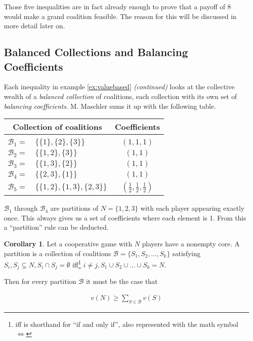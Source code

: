 \documentclass[10pt,a4paper,titlepage]{article}
\theoremstyle{plain}
\theoremstyle{definition}
\newtheorem{corollary}[thm]{Corollary}
\begin{document}
Those five inequalities are in fact already enough to prove that a payoff of 8 would make a grand coalition feasible. The reason for this will be discussed in more detail later on.




\subsection{Balanced Collections and Balancing Coefficients}
Each inequality in example \ref{ex:valuebased} \textit{(continued)} looks at the collective wealth of a \textit{balanced collection} of coalitions, each collection with its own set of \textit{balancing coefficients}. M. Maschler\cite{maschler} sums it up with the following table.\vspace{8pt}

\begin{tabular}{ | r l | c | }
    \multicolumn{2}{c}{Collection of coalitions} & \multicolumn{1}{c}{Coefficients}\\[2pt]
    \hline & & \\[-8pt]
    $\mathcal{B}_1 =$ & $\{\{1\}, \{2\}, \{3\}\}$ & $(1, 1, 1)$\\[2pt]
    $\mathcal{B}_2 =$ & $\{\{1, 2\}, \{3\}\}$ & $(1, 1)$\\[2pt]
    $\mathcal{B}_3 =$ & $\{\{1, 3\}, \{2\}\}$ & $(1, 1)$\\[2pt]
    $\mathcal{B}_4 =$ & $\{\{2, 3\}, \{1\}\}$ & $(1, 1)$\\[2pt]
    $\mathcal{B}_5 =$ & $\{\{1, 2\}, \{1, 3\}, \{2, 3\}\}$ & $(\frac{1}{2}, \frac{1}{2}, \frac{1}{2})$\\[2pt]
    \hline
\end{tabular}\vspace{8pt}

$\mathcal{B}_1$ through $\mathcal{B}_4$ are partitions of $N = \{1, 2, 3\}$ with each player appearing exactly once. This always gives us a set of coefficients where each element is 1. From this a \enquote{partition} rule can be deducted.

\begin{corollary}
    Let a cooperative game with $N$ players have a nonempty core. A partition is a collection of coalitions $\mathcal{B} = \{S_1, S_2, ..., S_k\}$ satisfying $S_i, S_j \subsetneq N, S_i \cap S_j = \emptyset$ iff\footnote{iff is shorthand for \enquote{if and only if}, also represented with the math symbol $\Leftrightarrow$} $i \neq j, S_1 \cup S_2 \cup ... \cup S_k = N$.

    Then for every partition $\mathcal{B}$ it must be the case that

    \begin{align}
        v(N) \geq \sum_{S \in \mathcal{B}} v(S)
    \end{align}
\end{corollary}
\end{document}
